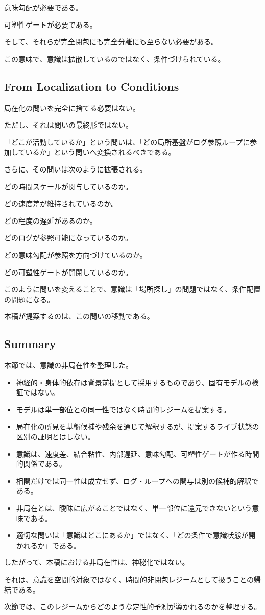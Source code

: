 意味勾配が必要である。

可塑性ゲートが必要である。

そして、それらが完全閉包にも完全分離にも至らない必要がある。

この意味で、意識は拡散しているのではなく、条件づけられている。

\subsection{From Localization to Conditions}

局在化の問いを完全に捨てる必要はない。

ただし、それは問いの最終形ではない。

「どこが活動しているか」という問いは、「どの局所基盤がログ参照ループに参加しているか」という問いへ変換されるべきである。

さらに、その問いは次のように拡張される。

どの時間スケールが関与しているのか。

どの速度差が維持されているのか。

どの程度の遅延があるのか。

どのログが参照可能になっているのか。

どの意味勾配が参照を方向づけているのか。

どの可塑性ゲートが開閉しているのか。

このように問いを変えることで、意識は「場所探し」の問題ではなく、条件配置の問題になる。

本稿が提案するのは、この問いの移動である。

\subsection{Summary}

本節では、意識の非局在性を整理した。

\begin{itemize}
\item 神経的・身体的依存は背景前提として採用するものであり、固有モデルの検証ではない。
\item モデルは単一部位との同一性ではなく時間的レジームを提案する。
\item 局在化の所見を基盤候補や残余を通じて解釈するが、提案するライブ状態の区別の証明とはしない。
\item 意識は、速度差、結合粘性、内部遅延、意味勾配、可塑性ゲートが作る時間的関係である。
\item 相関だけでは同一性は成立せず、ログ・ループへの関与は別の候補的解釈である。
\item 非局在とは、曖昧に広がることではなく、単一部位に還元できないという意味である。
\item 適切な問いは「意識はどこにあるか」ではなく、「どの条件で意識状態が開かれるか」である。
\end{itemize}

したがって、本稿における非局在性は、神秘化ではない。

それは、意識を空間的対象ではなく、時間的非閉包レジームとして扱うことの帰結である。

次節では、このレジームからどのような定性的予測が導かれるのかを整理する。
